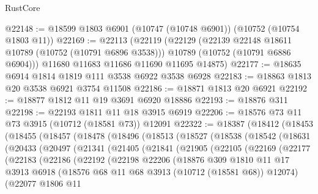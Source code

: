 \begin{lexlean}{RustCore}
\begin{coremodule}
@22148 := @18599 @1803 @6901 (@10747 (@10748 @6901)) (@10752 (@10754 @1803 @11))
@22169 := @22113
    (@22119
      (@22129
        (@22139 @22148 @18611 @10789 (@10752 (@10791 @6896 @3538)))
        @10789
        (@10752 (@10791 @6886 @6904)))
      @11680
      @11683
      @11686
      @11690
      @11695
      @14875)
@22177 := @18635 @6914 @1814 @1819 @111 @3538 @6922 @3538 @6928
@22183 := @18863 @1813 @20 @3538 @6921 @3754 @11508
@22186 := @18871 @1813 @20 @6921
@22192 := @18877 @1812 @11 @19 @3691 @6920 @18886
@22193 := @18876 @311
@22198 := @22193 @1811 @11 @18 @3915 @6919
@22206 := @18576 @73 @11 @73 @3915 (@10712 (@18581 @73)) @12091
@22322 := @18387
    (@18412
      (@18453
        (@18455
          (@18457
            (@18478
              (@18496
                (@18513
                  (@18527
                    (@18538
                      (@18542
                        (@18631
                          (@20433
                            (@20497
                              (@21341
                                (@21405
                                  (@21841
                                    (@21905
                                      (@22105
                                        (@22169
                                          (@22177
                                            (@22183
                                              (@22186
                                                (@22192
                                                  (@22198
                                                    @22206
                                                    (@18876
                                                      @309
                                                      @1810
                                                      @11
                                                      @17
                                                      @3913
                                                      @6918
                                                      (@18576
                                                        @68
                                                        @11
                                                        @68
                                                        @3913
                                                        (@10712 (@18581 @68))
                                                        @12074)
                                                      (@22077
                                                        @1806
                                                        @11

\end{coremodule}
\end{lexlean}
